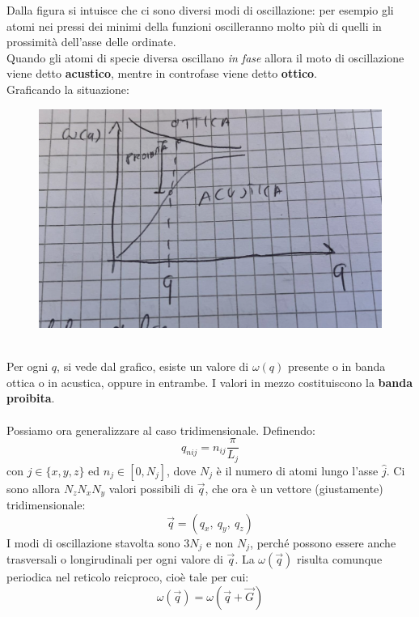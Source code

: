 \documentclass{book}
\begin{document}
            Dalla figura si intuisce che ci sono diversi modi di oscillazione: per esempio gli atomi nei pressi dei minimi della funzioni oscilleranno molto più di quelli in prossimità dell'asse delle ordinate.\\
            Quando gli atomi di specie diversa oscillano \textit{in fase} allora il moto di oscillazione viene detto \textbf{acustico}, mentre in controfase viene detto \textbf{ottico}.\\
            \newpage
            Graficando la situazione:
            \begin{figure}[h!]
                \centering
                \includegraphics[width=0.5\linewidth]{img/imnothere6.png}
            \end{figure} \\
            Per ogni $q$, si vede dal grafico, esiste un valore di $\omega(q)$ presente o in banda ottica o in acustica, oppure in entrambe. I valori in mezzo costituiscono la \textbf{banda proibita}.
            \paragraph{}
            Possiamo ora generalizzare al caso tridimensionale. Definendo:
            $$q_{nij} = n_{ij}\frac{\pi}{L_{j}}$$
            con $j \in \{x, y, z\}$ ed $n_{j} \in [0, N_{j}]$, dove $N_{j}$ è il numero di atomi lungo l'asse $\hat{j}$.
            Ci sono allora $N_{z}N_{x}N_{y}$ valori possibili di $\vec{q}$, che ora è un vettore (giustamente) tridimensionale:
            $$\vec{q} = (q_{x}, \ q_{y}, \ q_{z})$$
            I modi di oscillazione stavolta sono $3N_{j}$ e non $N_{j}$, perché possono essere anche trasversali o longirudinali per ogni valore di $\vec{q}$. La $\omega(\vec{q})$ risulta comunque periodica nel reticolo reicproco, cioè tale per cui:
            $$\omega (\vec{q}) = \omega(\vec{q} + \vec{G})$$
\end{document}

